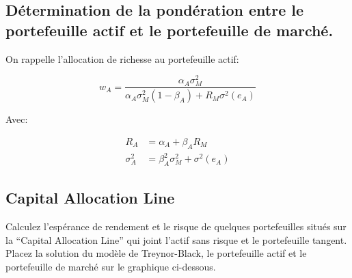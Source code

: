 \documentclass[
]{article}
\newenvironment{Shaded}{\begin{snugshade}}{\end{snugshade}}
\newcommand{\AttributeTok}[1]{\textcolor[rgb]{0.77,0.63,0.00}{#1}}
\newcommand{\ControlFlowTok}[1]{\textcolor[rgb]{0.13,0.29,0.53}{\textbf{#1}}}
\newcommand{\DecValTok}[1]{\textcolor[rgb]{0.00,0.00,0.81}{#1}}
\newcommand{\FloatTok}[1]{\textcolor[rgb]{0.00,0.00,0.81}{#1}}
\newcommand{\FunctionTok}[1]{\textcolor[rgb]{0.00,0.00,0.00}{#1}}
\newcommand{\NormalTok}[1]{#1}
\newcommand{\OtherTok}[1]{\textcolor[rgb]{0.56,0.35,0.01}{#1}}
\newcommand{\SpecialCharTok}[1]{\textcolor[rgb]{0.00,0.00,0.00}{#1}}
\newcommand{\StringTok}[1]{\textcolor[rgb]{0.31,0.60,0.02}{#1}}
\begin{document}
\hypertarget{duxe9termination-de-la-ponduxe9ration-entre-le-portefeuille-actif-et-le-portefeuille-de-marchuxe9.}{%
\subsection{Détermination de la pondération entre le portefeuille actif
et le portefeuille de
marché.}\label{duxe9termination-de-la-ponduxe9ration-entre-le-portefeuille-actif-et-le-portefeuille-de-marchuxe9.}}

On rappelle l'allocation de richesse au portefeuille actif:

\[
w_A = \frac{\alpha_A \sigma^2_M}{\alpha_A \sigma^2_M (1-\beta_A) + R_M \sigma^2(e_A)}
\]

Avec:

\[
\begin{aligned}
R_A & = \alpha_A + \beta_A R_M \\
\sigma^2_A & = \beta^2_A \sigma^2_M + \sigma^2(e_A)
\end{aligned}
\]

\hypertarget{capital-allocation-line}{%
\subsection{Capital Allocation Line}\label{capital-allocation-line}}

Calculez l'espérance de rendement et le risque de quelques portefeuilles
situés sur la ``Capital Allocation Line'' qui joint l'actif sans risque
et le portefeuille tangent. Placez la solution du modèle de
Treynor-Black, le portefeuille actif et le portefeuille de marché sur le
graphique ci-dessous.

\begin{Shaded}
\end{Shaded}
\end{document}
